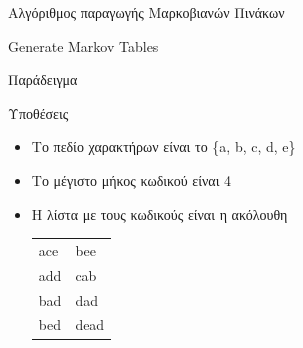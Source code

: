 \documentclass[10pt]{beamer}
\begin{document}
\begin{frame}{Αλγόριθμος παραγωγής Μαρκοβιανών Πινάκων}
    \begin{algorithm}[H]
        \small
        \caption{Generate Markov Tables}
        \label{alg:gen_markov_tables}
        \begin{algorithmic}[1]
            \STATE{} 
                    \ENDFOR
                \ENDFOR
            \ENDFOR

            \STATE{} 
                \ENDFOR
            \ENDFOR
        \end{algorithmic}
    \end{algorithm}
\end{frame}

\begin{frame}{Παράδειγμα}
    \begin{block}{Υποθέσεις}
        \begin{itemize}
            \item Το πεδίο χαρακτήρων είναι το \{a, b, c, d, e\}
            \item Το μέγιστο μήκος κωδικού είναι 4
            \item Η λίστα με τους κωδικούς είναι η ακόλουθη
            \begin{table}
                \begin{tabular}{ll}
                    ace & bee \\
                    add & cab \\
                    bad & dad \\
                    bed & dead \\
                \end{tabular}
            \end{table}
        \end{itemize}
    \end{block}
\end{frame}


\end{document}

